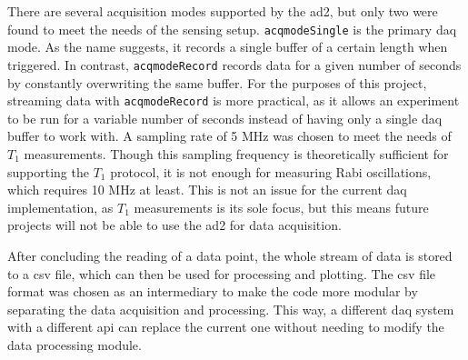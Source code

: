 There are several acquisition modes supported by the \gls{ad2}, but only two were found to meet the needs of the sensing setup. \lstinline|acqmodeSingle| is the primary \gls{daq} mode. As the name suggests, it records a single buffer of a certain length when triggered. In contrast, \lstinline|acqmodeRecord| records data for a given number of seconds by constantly overwriting the same buffer. For the purposes of this project, streaming data with \lstinline|acqmodeRecord| is more practical, as it allows an experiment to be run for a variable number of seconds instead of having only a single \gls{daq} buffer to work with. A sampling rate of 5 \unit[]{\mega\hertz} was chosen to meet the needs of $T_1$ measurements. Though this sampling frequency is theoretically sufficient for supporting the $T_1$ protocol, it is not enough for measuring Rabi oscillations, which requires 10 \unit{\mega\hertz} at least. This is not an issue for the current \gls{daq} implementation, as $T_1$ measurements is its sole focus, but this means future projects will not be able to use the \gls{ad2} for data acquisition.

After concluding the reading of a data point, the whole stream of data is stored to a \gls{csv} file, which can then be used for processing and plotting. The \gls{csv} file format was chosen as an intermediary to make the code more modular by separating the data acquisition and processing. This way, a different \gls{daq} system with a different \gls{api} can replace the current one without needing to modify the data processing module.

